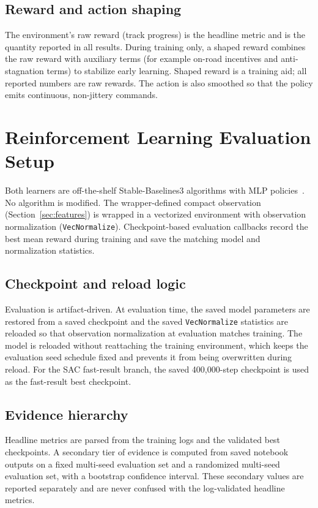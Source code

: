 \documentclass[conference]{IEEEtran}
\begin{document}
\subsection{Reward and action shaping}

The environment's raw reward (track progress) is the headline metric and is the
quantity reported in all results. During training only, a shaped reward combines
the raw reward with auxiliary terms (for example on-road incentives and
anti-stagnation terms) to stabilize early learning. Shaped reward is a training
aid; all reported numbers are raw rewards. The action is also smoothed so that
the policy emits continuous, non-jittery commands.

\section{Reinforcement Learning Evaluation Setup}

Both learners are off-the-shelf Stable-Baselines3 algorithms with MLP
policies~\cite{ref_sb3, ref_ppo_mod, ref_sac_mod}. No algorithm is modified.
The wrapper-defined compact observation (Section~\ref{sec:features}) is wrapped
in a vectorized environment with observation normalization
(\texttt{VecNormalize}). Checkpoint-based evaluation callbacks record the best
mean reward during training and save the matching model and normalization
statistics.

\subsection{Checkpoint and reload logic}

Evaluation is artifact-driven. At evaluation time, the saved model parameters
are restored from a saved checkpoint and the saved \texttt{VecNormalize}
statistics are reloaded so that observation normalization at evaluation matches
training. The model is reloaded without reattaching the training environment,
which keeps the evaluation seed schedule fixed and prevents it from being
overwritten during reload. For the SAC fast-result branch, the saved
400{,}000-step checkpoint is used as the fast-result best checkpoint.

\subsection{Evidence hierarchy}

Headline metrics are parsed from the training logs and the validated best
checkpoints. A secondary tier of evidence is computed from saved notebook
outputs on a fixed multi-seed evaluation set and a randomized multi-seed
evaluation set, with a bootstrap confidence interval. These secondary values
are reported separately and are never confused with the log-validated headline
metrics.
\end{document}
